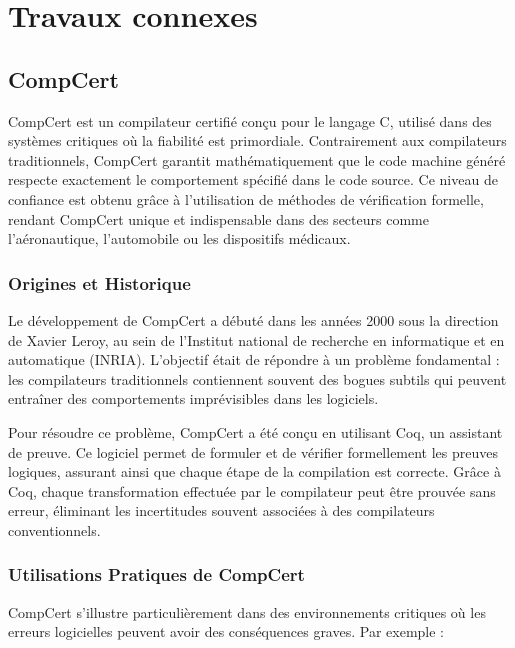%
\chapter{Travaux connexes}
\label{sec::chapitre5}

\section{CompCert}
CompCert est un compilateur certifié conçu pour le langage C, utilisé dans des systèmes critiques où la fiabilité est primordiale. Contrairement aux compilateurs traditionnels, CompCert garantit mathématiquement que le code machine généré respecte exactement le comportement spécifié dans le code source. Ce niveau de confiance est obtenu grâce à l'utilisation de méthodes de vérification formelle, rendant CompCert unique et indispensable dans des secteurs comme l’aéronautique, l’automobile ou les dispositifs médicaux.

\subsection{Origines et Historique}
Le développement de CompCert a débuté dans les années 2000 sous la direction de Xavier Leroy, au sein de l’Institut national de recherche en informatique et en automatique (INRIA). L’objectif était de répondre à un problème fondamental : les compilateurs traditionnels contiennent souvent des bogues subtils qui peuvent entraîner des comportements imprévisibles dans les logiciels.

Pour résoudre ce problème, CompCert a été conçu en utilisant Coq, un assistant de preuve. Ce logiciel permet de formuler et de vérifier formellement les preuves logiques, assurant ainsi que chaque étape de la compilation est correcte. Grâce à Coq, chaque transformation effectuée par le compilateur peut être prouvée sans erreur, éliminant les incertitudes souvent associées à des compilateurs conventionnels.

\subsection{Utilisations Pratiques de CompCert}
CompCert s’illustre particulièrement dans des environnements critiques où les erreurs logicielles peuvent avoir des conséquences graves. Par exemple :

